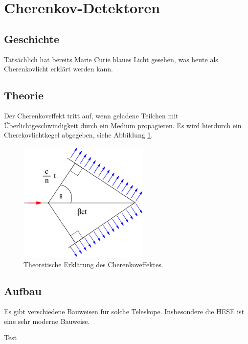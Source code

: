 \section{Cherenkov-Detektoren}


\subsection{Geschichte}
Tatsächlich hat bereits Marie Curie blaues Licht gesehen, was heute als Cherenkovlicht erklärt werden kann.

\subsection{Theorie}
Der Cherenkoveffekt tritt auf, wenn geladene Teilchen mit Überlichtgeschwindigkeit durch ein Medium propagieren. Es wird hierdurch ein Cherekovlichtkegel abgegeben, siehe Abbildung \ref{fig:aufbau}.

\begin{figure}[H]
  \centering
  \includegraphics[height=6.0cm]{content/Cherenkov.png}
  \caption{Theoretische Erklärung des Cherenkoveffektes.}
  \label{fig:aufbau}
\end{figure}

\subsection{Aufbau}
Es gibt verschiedene Bauweisen für solche Teleskope. Insbesondere die HESE ist eine sehr moderne Bauweise.

Test~\cite{Gil:02}


